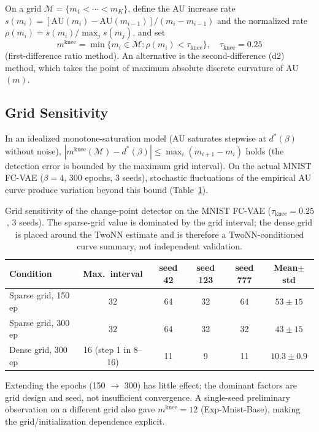 \documentclass[make,article,submit,pdftex,moreauthors]{Definitions/mdpi}
\newcommand{\mknee}{m^{\mathrm{knee}}}
\newcommand{\dstar}{d^{*}(\beta)}
\begin{document}
On a grid $\mathcal{M} = \{m_1 < \cdots < m_K\}$, define the AU increase
rate $s(m_i) = [\mathrm{AU}(m_i) - \mathrm{AU}(m_{i-1})] / (m_i - m_{i-1})$
and the normalized rate $\rho(m_i) = s(m_i) / \max_j s(m_j)$, and set
\begin{equation}
  \mknee = \min\{m_i \in \mathcal{M} : \rho(m_i) < \tau_{\mathrm{knee}}\},
  \quad \tau_{\mathrm{knee}} = 0.25
  \label{eq:mknee}
\end{equation}
(first-difference ratio method).
An alternative is the second-difference (d2) method, which takes the point
of maximum absolute discrete curvature of AU$(m)$.

\subsection[\appendixname~\thesubsection]{Grid Sensitivity}

In an idealized monotone-saturation model (AU saturates stepwise at
$\dstar$ without noise),
$|\mknee(\mathcal{M}) - \dstar| \leq \max_i (m_{i+1} - m_i)$ holds
(the detection error is bounded by the maximum grid interval).
On the actual MNIST FC-VAE ($\beta = 4$, 300 epochs, 3 seeds), stochastic
fluctuations of the empirical AU curve produce variation beyond this bound
(Table~\ref{tab:knee_grid}).

\begin{table}[H]
\caption{Grid sensitivity of the change-point detector on the MNIST FC-VAE
($\tau_{\mathrm{knee}} = 0.25$, 3 seeds). The sparse-grid value is dominated
by the grid interval; the dense grid is placed around the TwoNN estimate and
is therefore a TwoNN-conditioned curve summary, not independent
validation.}
\label{tab:knee_grid}
\small
\begin{tabular}{lccccc}
\toprule
\textbf{Condition} & \textbf{Max.\ interval} & \textbf{seed 42} & \textbf{seed 123} & \textbf{seed 777} & \textbf{Mean$\pm$std} \\
\midrule
Sparse grid, 150 ep & 32 & 64 & 32 & 64 & $53 \pm 15$ \\
Sparse grid, 300 ep & 32 & 64 & 32 & 32 & $43 \pm 15$ \\
Dense grid, 300 ep & 16 (step 1 in 8--16) & 11 & 9 & 11 & $10.3 \pm 0.9$ \\
\bottomrule
\end{tabular}
\end{table}

Extending the epochs (150 $\to$ 300) has little effect; the dominant factors
are grid design and seed, not insufficient convergence.
A single-seed preliminary observation on a different grid also gave
$\mknee = 12$ (Exp-Mnist-Base), making the grid/initialization dependence
explicit.
\end{document}
